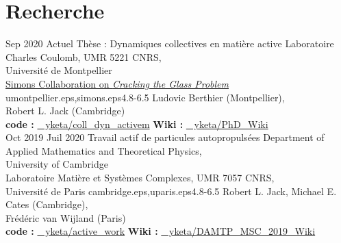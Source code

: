 \documentclass[letterpaper]{cvtemplate_fr} %
\begin{document}
\makeprofile %


\vspace{\parskip}
\section{Recherche}

\begin{cvbody}

\cvitem
	{Sep 2020}
	{Actuel}
  {Thèse : Dynamiques collectives en mati\`ere active}
  {Laboratoire Charles Coulomb, UMR 5221 CNRS,\\ Universit\'e de Montpellier \\
  \href{https://scglass.uchicago.edu}{Simons Collaboration on \textit{Cracking the Glass Problem}}}
	{umontpellier.eps,simons.eps}{4.8}{-6.5}
	{Ludovic Berthier (Montpellier),\\ Robert L. Jack (Cambridge)}
  {\\
	{\bf code :} \href{https://github.com/yketa/coll_dyn_activem}{\faGithub~ yketa/coll\_dyn\_activem} \hfill {\bf Wiki :} \href{https://yketa.github.io/PhD_Wiki}{\faGithub~ yketa/PhD\_Wiki}
  }
  \\

\cvitem
	{Oct 2019}
	{Juil 2020}
  {Travail actif de particules autopropuls\'ees}
  {Department of Applied Mathematics and Theoretical Physics,\\ University of Cambridge \\
	Laboratoire Mati\`ere et Syst\`emes Complexes, UMR 7057 CNRS,\\ Universit\'e de Paris }
	{cambridge.eps,uparis.eps}{4.8}{-6.5}
	{Robert L. Jack, Michael E. Cates (Cambridge),\\ Fr\'ed\'eric van Wijland (Paris)}
  {\\
  {\bf code :} \href{https://github.com/yketa/active_work}{\faGithub~ yketa/active\_work} \hfill {\bf Wiki :} \href{https://yketa.github.io/DAMTP_MSC_2019_Wiki}{\faGithub~ yketa/DAMTP\_MSC\_2019\_Wiki}
  }
  \\


\end{cvbody}
\end{document}

